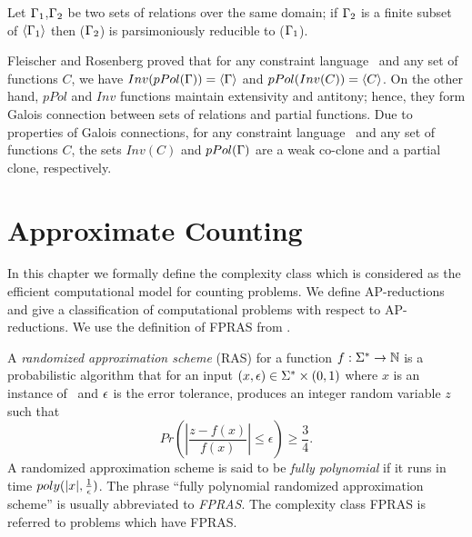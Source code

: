 \begin{theorem}  \label{trm:partial}
Let \(\Gamma_1\),\(\Gamma_2\) be two sets of relations over the same domain; if 
\(\Gamma_2\) is a finite subset of \(\langle \Gamma_1 \rangle\) then
\ccsp(\(\Gamma_2\)) is parsimoniously reducible to \ccsp(\(\Gamma_1\))\@.
\end{theorem}

Fleischer and Rosenberg \cite{Rosenberg} proved that for any constraint language \mrelset\
and any set of functions \(C\),
we have \(Inv(pPol(\Gamma))=\langle \Gamma \rangle\) and
\(pPol(Inv(C))=\langle C \rangle\)\@. On the other hand, \(pPol\) and \(Inv\) functions 
maintain extensivity and antitony; hence, they form Galois connection between 
sets of relations and partial functions. Due to properties of Galois connections,
for any constraint language \mrelset\ and any set of functions \(C\), the 
sets \(Inv(C)\) and \(pPol(\Gamma)\) are a weak co-clone and a partial clone, respectively.

\chapter{Approximate Counting} \label{chp:approx}
In this chapter we formally define the complexity class which
is considered as the efficient computational model for counting problems.
We define AP-reductions and give a classification of computational problems 
with respect to AP-reductions. We use the definition of FPRAS from \cite{counting}\@. 

A \emph{randomized approximation scheme} (RAS) for a function \(f:\Sigma^*\to\mathbb{N}\)
is a probabilistic algorithm that for an input \((x,\epsilon)\in\Sigma^*\times(0,1)\) 
where \(x\) is an instance of \mf\ and \(\epsilon\) is the error tolerance, 
produces an integer random variable \(z\) such that 
\[Pr\left(\left|\frac{z-f(x)}{f(x)}\right|\le \epsilon\right) \ge \frac{3}{4}.\]
A randomized approximation scheme is said to be \emph{fully polynomial} if it runs in time \(poly(|x|,\frac{1}{\epsilon})\)\@. 
The phrase ``fully polynomial randomized approximation scheme'' is usually abbreviated to 
\emph{FPRAS}\@. The complexity class FPRAS is referred to problems which have FPRAS\@.

